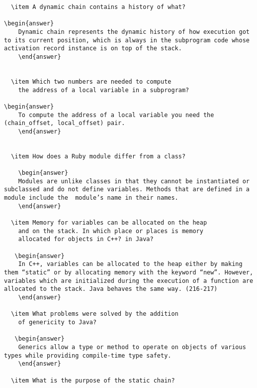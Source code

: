 \begin{enumerate}
\begin{answer}
\begin{lstlisting}
  \item A dynamic chain contains a history of what?

\begin{answer}
    Dynamic chain represents the dynamic history of how execution got to its current position, which is always in the subprogram code whose activation record instance is on top of the stack.
    \end{answer}
 

  \item Which two numbers are needed to compute
    the address of a local variable in a subprogram?

\begin{answer}
    To compute the address of a local variable you need the (chain_offset, local_offset) pair.
    \end{answer}


  \item How does a Ruby module differ from a class?

    \begin{answer}
    Modules are unlike classes in that they cannot be instantiated or subclassed and do not define variables. Methods that are defined in a module include the  module’s name in their names.
    \end{answer}

  \item Memory for variables can be allocated on the heap
    and on the stack. In which place or places is memory
    allocated for objects in C++? in Java?

   \begin{answer}
    In C++, variables can be allocated to the heap either by making them “static” or by allocating memory with the keyword “new”. However, variables which are initialized during the execution of a function are allocated to the stack. Java behaves the same way. (216-217)
    \end{answer}

  \item What problems were solved by the addition
    of genericity to Java?

   \begin{answer}
    Generics allow a type or method to operate on objects of various types while providing compile-time type safety.
    \end{answer}

  \item What is the purpose of the static chain?


\end{lstlisting}
\end{answer}
\end{enumerate}
